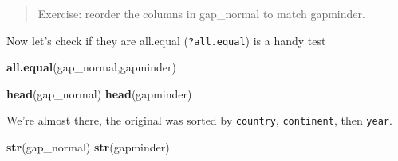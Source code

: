 \documentclass[]{book}
\newenvironment{Shaded}{\begin{snugshade}}{\end{snugshade}}
\newcommand{\KeywordTok}[1]{\textcolor[rgb]{0.13,0.29,0.53}{\textbf{{#1}}}}
\newcommand{\StringTok}[1]{\textcolor[rgb]{0.31,0.60,0.02}{{#1}}}
\newcommand{\CommentTok}[1]{\textcolor[rgb]{0.56,0.35,0.01}{\textit{{#1}}}}
\newcommand{\NormalTok}[1]{{#1}}
\theoremstyle{definition}
\theoremstyle{definition}
\theoremstyle{definition}
\theoremstyle{remark}
\begin{document}
\begin{quote}
Exercise: reorder the columns in gap\_normal to match gapminder.
\end{quote}

\begin{Shaded}
\end{Shaded}

Now let's check if they are all.equal (\texttt{?all.equal}) is a handy
test

\begin{Shaded}
\begin{Highlighting}[]
\KeywordTok{all.equal}\NormalTok{(gap_normal,gapminder)}
\end{Highlighting}
\end{Shaded}

\begin{Shaded}
\begin{Highlighting}[]
\KeywordTok{head}\NormalTok{(gap_normal)}
\KeywordTok{head}\NormalTok{(gapminder)}
\end{Highlighting}
\end{Shaded}

We're almost there, the original was sorted by \texttt{country},
\texttt{continent}, then \texttt{year}.

\begin{Shaded}
\end{Shaded}

\begin{Shaded}
\begin{Highlighting}[]
\KeywordTok{str}\NormalTok{(gap_normal)}
\KeywordTok{str}\NormalTok{(gapminder)}
\end{Highlighting}
\end{Shaded}
\end{document}
